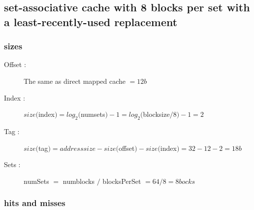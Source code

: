 \documentclass[12pt]{article}
\begin{document}
		\subsection{set-associative cache with 8 blocks per set with a least-recently-used replacement}

			\subsubsection{sizes}
			
				\begin{description}
					\item[Offset : ] The same as direct mapped cache $ = 12 b$
					\item[Index : ] $size($index$) = log_2($numsets$) -1 = log_2($blocksize$/8) - 1 = 2$
					\item[Tag : ] $size($tag$) = addresssize- size($offset$) - size($index$) = 32 - 12 -2 = 18b$
					\item[Sets : ] numSets $=$ numblocks $/$ blocksPerSet $= 64 / 8 = 8 bocks$
				\end{description}

			\subsubsection{hits and misses}
			
\end{document}
